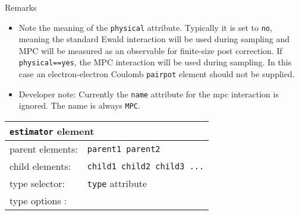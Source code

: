 \FloatBarrier
Remarks
\begin{itemize}
  \item{Note the meaning of the \texttt{physical} attribute.  Typically it is set to \texttt{no}, meaning the standard Ewald interaction will be used during sampling and MPC will be measured as an observable for finite-size post correction.  If \texttt{physical==yes}, the MPC interaction will be used during sampling.  In this case an electron-electron Coulomb \texttt{pairpot} element should not be supplied.}
  \item{Developer note: Currently the \texttt{name} attribute for the mpc interaction is ignored.  The name is always \texttt{MPC}.}
\end{itemize}






\begin{table}[h]
\begin{center}
\begin{tabularx}{\textwidth}{l l l l l l }
\hline
\multicolumn{6}{l}{\texttt{estimator} element} \\
\hline
\multicolumn{2}{l}{parent elements:} & \multicolumn{4}{l}{\texttt{parent1 parent2}}\\
\multicolumn{2}{l}{child  elements:} & \multicolumn{4}{l}{\texttt{child1 child2 child3 ...}}\\
\multicolumn{2}{l}{type   selector:} & \multicolumn{4}{l}{\texttt{type} attribute}\\
\multicolumn{2}{l}{type   options :} & \multicolumn{4}{l}{}\\
  \hline
\end{tabularx}
\end{center}
\end{table}



